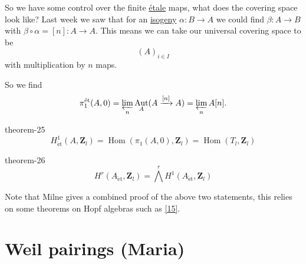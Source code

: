 \documentclass[10pt,]{book}
\numberwithin{equation}{section}
\newcommand{\lb}{[}
\newcommand{\rb}{]}
\newcommand{\ZZ}{\mathbf{Z}}
\newcommand{\et}{\mathrm{\acute{e}t}}
\DeclareMathOperator{\Hom}{Hom}
\DeclareMathOperator{\Aut}{Aut}
\begin{document}
\hypertarget{p-294}{}%
So we have some control over the finite \hyperref[def-etale]{étale} maps, what does the covering space look like? Last week we saw that for an \hyperref[def-supersing-isog-isog]{isogeny} \(\alpha\colon B \to A\) we could find \(\beta \colon A \to B\) with \(\beta\circ\alpha = \lb n\rb\colon A \to A\). This means we can take our universal covering space to be%
\begin{equation*}
(A)_{i\in I}
\end{equation*}
with multiplication by \(n\) maps.%
\par
\hypertarget{p-295}{}%
So we find%
\begin{equation*}
\pi_1^\et(A,0) =\varprojlim_n \Aut_A(A\xrightarrow{[n]} A)=  \varprojlim_n A[n]\text{.}
\end{equation*}
%
\begin{theorem}{}{}{theorem-25}%
\hypertarget{p-296}{}%
%
\begin{equation*}
H^1_\et(A , \ZZ_l) = \Hom(\pi_1(A,0), \ZZ_l) = \Hom(T_l,\ZZ_l)
\end{equation*}
%
\end{theorem}
\begin{theorem}{}{}{theorem-26}%
\hypertarget{p-297}{}%
%
\begin{equation*}
H^r(A_\et, \ZZ_l) = \bigwedge^r H^1(A_\et, \ZZ_l)
\end{equation*}
%
\end{theorem}
\hypertarget{p-298}{}%
Note that Milne gives a combined proof of the above two statements, this relies on some theorems on Hopf algebras such as \hyperlink{bib-borel-hopf}{[15]}.%
%
%
\typeout{************************************************}
\typeout{************************************************}
%
\section[{Weil pairings (Maria)}]{Weil pairings (Maria)}\label{sec-weil-pairings}
%
%
\typeout{************************************************}
\typeout{************************************************}
%
\end{document}
